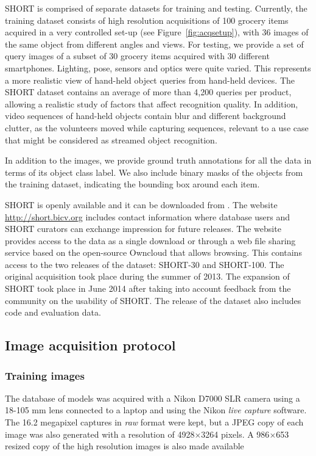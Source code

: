 SHORT is comprised of separate datasets for training and testing. Currently, the training dataset consists of high resolution acquisitions of 100 grocery items acquired in a very controlled set-up (see Figure~\ref{fig:acqsetup}), with 36 images of the same object from different angles and views. For testing, we provide a set of query images of a subset of 30 grocery items acquired with 30 different smartphones. Lighting, pose, sensors and optics were quite varied. This represents a more realistic view of hand-held object queries from hand-held devices. The SHORT dataset contains an average of more than 4,200 queries per product, allowing a realistic study of factors that affect recognition quality. In addition, video sequences of hand-held objects contain blur and different background clutter, as the volunteers moved while capturing sequences, relevant to a use case that might be considered as streamed object recognition. 



In addition to the images, we provide ground truth annotations for all the data in terms of its object class label. We also include binary masks of the objects from the training dataset, indicating the bounding box around each item.

SHORT is openly available and it can be downloaded from \cite{Rivera-Rubio}. The website  \url{http://short.bicv.org} includes contact information where database users and SHORT curators can exchange impression for future releases. The website provides access to the data as a single download or through a web file sharing service based on the open-source Owncloud that allows browsing. This contains access to the two releases of the dataset: SHORT-30 and SHORT-100. The original acquisition took place during the summer of 2013. The expansion of SHORT took place in June 2014 after taking into account feedback from the community on the usability of SHORT. The release of the dataset also includes code and evaluation data.

\subsection{Image acquisition protocol}

\subsubsection{Training images}

The database of models was acquired with a Nikon D7000 SLR camera using a 18-105 mm lens connected to a laptop and using the Nikon \textit{live capture} software. The 16.2 megapixel captures in \textit{raw} format were kept, but a JPEG copy of each image was also generated with a resolution of 4928$\times$3264 pixels. A 986$\times$653 resized copy of the high resolution images is also made available

